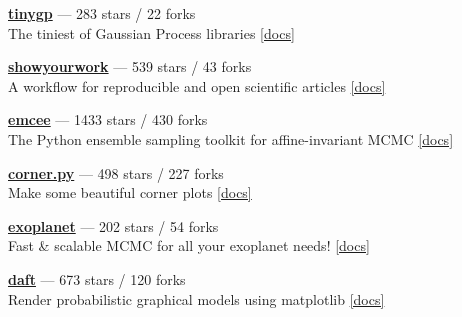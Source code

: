 \item \href{https://github.com/dfm/tinygp}{{\bf tinygp}} --- 283 stars / 22 forks \\
The tiniest of Gaussian Process libraries \href{https://tinygp.readthedocs.io}{[docs]}

\item \href{https://github.com/showyourwork/showyourwork}{{\bf showyourwork}} --- 539 stars / 43 forks \\
A workflow for reproducible and open scientific articles \href{https://show-your.work}{[docs]}

\item \href{https://github.com/dfm/emcee}{{\bf emcee}} --- 1433 stars / 430 forks \\
The Python ensemble sampling toolkit for affine-invariant MCMC \href{https://emcee.readthedocs.io}{[docs]}

\item \href{https://github.com/dfm/corner.py}{{\bf corner.py}} --- 498 stars / 227 forks \\
Make some beautiful corner plots \href{http://corner.readthedocs.io}{[docs]}

\item \href{https://github.com/exoplanet-dev/exoplanet}{{\bf exoplanet}} --- 202 stars / 54 forks \\
Fast {\&} scalable MCMC for all your exoplanet needs!  \href{https://docs.exoplanet.codes}{[docs]}

\item \href{https://github.com/daft-dev/daft}{{\bf daft}} --- 673 stars / 120 forks \\
Render probabilistic graphical models using matplotlib \href{https://docs.daft-pgm.org}{[docs]}